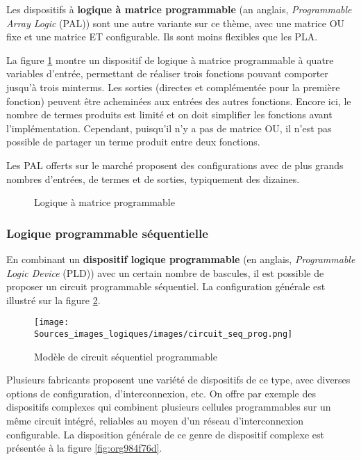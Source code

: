 \documentclass[11pt]{article}
\begin{document}
Les dispositifs à \textbf{logique à matrice programmable} (an anglais,
\emph{Programmable Array Logic} (PAL)) sont une autre variante sur ce
thème, avec une matrice OU fixe et une matrice ET configurable. Ils
sont moins flexibles que les PLA.

La figure \ref{fig:org7b7c5d4} montre un dispositif de logique à matrice
programmable à quatre variables d'entrée, permettant de réaliser trois
fonctions pouvant comporter jusqu'à trois minterms. Les sorties
(directes et complémentée pour la première fonction) peuvent être
acheminées aux entrées des autres fonctions. Encore ici, le nombre de
termes produits est limité et on doit simplifier les fonctions avant
l'implémentation. Cependant, puisqu'il n'y a pas de matrice OU, il
n'est pas possible de partager un terme produit entre deux fonctions.

Les PAL offerts sur le marché proposent des configurations avec de
plus grands nombres d'entrées, de termes et de sorties, typiquement
des dizaines.


\begin{figure}[htbp]
\centering

\caption{\label{fig:org7b7c5d4}Logique à matrice programmable}
\end{figure}

\subsubsection{Logique programmable séquentielle}
\label{sec:org1d41363}

En combinant un \textbf{dispositif logique programmable} (en anglais,
\emph{Programmable Logic Device} (PLD)) avec un certain nombre de
bascules, il est possible de proposer un circuit programmable
séquentiel. La configuration générale est illustré sur la
figure \ref{fig:org23c28f3}.


\begin{figure}[htbp]
\centering
\texttt{[image: Sources\_images\_logiques/images/circuit\_seq\_prog.png]}
\caption{\label{fig:org23c28f3}Modèle de circuit séquentiel programmable}
\end{figure} 

Plusieurs fabricants proposent une variété de dispositifs de ce type,
avec diverses options de configuration, d'interconnexion, etc.  On
offre par exemple des dispositifs complexes qui combinent plusieurs
cellules programmables sur un même circuit intégré, reliables au moyen
d'un réseau d'interconnexion configurable. La disposition générale de
ce genre de dispositif complexe est présentée à la figure \ref{fig:org984f76d}.
\end{document}
